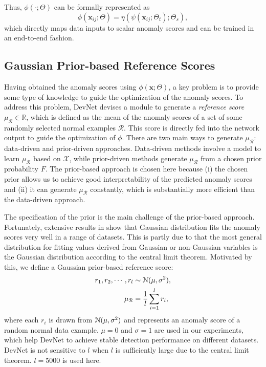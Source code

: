 \documentclass[10pt,journal,compsoc]{IEEEtran}
\begin{document}
Thus, $\phi(\cdot; \Theta)$ can be formally represented as 
\begin{equation}
    \phi(\mathbf{x}_{ij};\Theta) = \eta(\psi(\mathbf{x}_{ij};\Theta_{t});\Theta_s),
\end{equation}
which directly maps data inputs to scalar anomaly scores and can be trained in an end-to-end fashion.

\subsection{Gaussian Prior-based Reference Scores}\label{subsec:reference}

Having obtained the anomaly scores using $\phi(\mathbf{x};\Theta)$, a key problem is to provide some type of knowledge to guide the optimization of the anomaly scores. To address this problem, DevNet devises a module to generate a \textit{reference score} $\mu_{\mathcal{R}} \in \mathbb{R}$, which is defined as the mean of the anomaly scores of a set of some randomly selected normal examples $\mathcal{R}$. This score is directly fed into the network output to guide the optimization of $\phi$. There are two main ways to generate $\mu_{\mathcal{R}}$: data-driven and prior-driven approaches. Data-driven methods involve a model to learn $\mu_{\mathcal{R}}$ based on $\mathcal{X}$, while prior-driven methods generate $\mu_{\mathcal{R}}$ from a chosen prior probability $F$. The prior-based approach is chosen here because (i) the chosen prior allows us to achieve good interpretability of the predicted anomaly scores and (ii) it can generate $\mu_{\mathcal{R}}$ constantly, which is substantially more efficient than the data-driven approach.

The specification of the prior is the main challenge of the prior-based approach. Fortunately, extensive results in \cite{kriegel2011interpreting} show that Gaussian distribution fits the anomaly scores very well in a range of datasets. This is partly due to that the most general distribution for fitting values derived from Gaussian or non-Gaussian variables is the Gaussian distribution according to the central limit theorem. Motivated by this, we define a Gaussian prior-based reference score:
\begin{align}
    r_1, r_2, \cdots, r_l & \sim {\cal N}  (\mu, \sigma^{2}), \\
    \mu_{\mathcal{R}} & = \frac{1}{l}\sum_{i=1}^{l}r_i,
\end{align}
where each $r_i$ is drawn from ${\cal N} (\mu, \sigma^{2})$ and represents an anomaly score of a random normal data example. 
$\mu=0$ and $\sigma=1$ are used in our experiments, which help DevNet to achieve stable detection performance on different datasets. DevNet is not sensitive to $l$ when $l$ is sufficiently large due to the central limit theorem. $l=5000$ is used here. 
\end{document}
